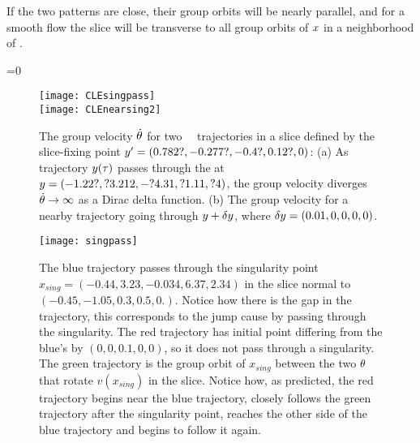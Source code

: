 If the two patterns are
close, their group orbits will be nearly parallel, and for a smooth flow
the slice will be transverse to all group orbits of $x$ in a
neighborhood of \slicep.

\beq
\braket{\groupTan(\sspRed)}{\sliceTan{}}=0

 \begin{figure}
\texttt{[image: CLEsingpass]}
\\
\texttt{[image: CLEnearsing2]}%
 \caption{\label{fig:dthetasing}
The group velocity $\dot{{\bf \theta}}$ for two \CLf\
\reducedsp\ trajectories in a slice defined by the slice-fixing
point ${y'}=(0.782?,-0.277?,-0.4?,0.12?,0)$:
 (a) As trajectory $y(\tau)$ passes through the
{\sset} 
 at $y=(-1.22?, ?3.212, -?4.31, ?1.11, ?4)$,
the group velocity diverges
$\dot{{\bf \theta}} \to \infty$ as a Dirac delta function.
(b) The group velocity for a nearby trajectory going
through $y+\delta y$,
where $\delta y=(0.01,0,0,0,0)$.
 }%
 \end{figure}

 \begin{figure}
\texttt{[image: singpass]}
 \caption{\label{fig:singpass}
The blue trajectory passes through the singularity point
$x_{sing}=(-0.44, 3.23, -0.034, 6.37, 2.34)$ in the slice normal to
$(-0.45, -1.05, 0.3, 0.5, 0.)$. Notice how there is the gap in the
trajectory, this corresponds to the jump cause by passing through the
singularity. The red trajectory has initial point differing from the
blue's by $(0,0,0.1,0,0)$, so it does not pass through a singularity. The
green trajectory is the group orbit of $x_{sing}$ between the two
${\bf \theta}$ that rotate $v(x_{sing})$ in the slice. Notice how, as
predicted, the red trajectory begins near the blue trajectory, closely
follows the green trajectory after the singularity point, reaches the
other side of the blue trajectory and begins to follow it
again.
 }%
 \end{figure}


%
